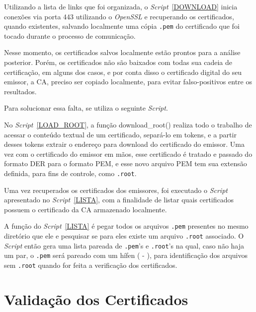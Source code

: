 		Utilizando a lista de links que foi organizada, o \textit{Script}~\ref{DOWNLOAD} inicia conexões via porta 443 utilizando o \textit{OpenSSL} e recuperando os certificados, quando existentes, salvando localmente uma cópia \texttt{.pem} do certificado que foi tocado durante o processo de comunicação.
		
		
		Nesse momento, os certificados salvos localmente estão prontos para a análise posterior. Porém, os certificados não são baixados com todas sua cadeia de certificação, em alguns dos casos, e por conta disso o certificado digital do seu emissor, a CA, preciso ser copiado localmente, para evitar falso-positivos entre os resultados.
		
		Para solucionar essa falta, se utiliza o seguinte \textit{Script}.
		
		
		No \textit{Script}~\ref{LOAD_ROOT}, a função download\_root() realiza todo o trabalho de acessar o conteúdo textual de um certificado, separá-lo em tokens, e  a partir desses tokens extrair o endereço para download do certificado do emissor. Uma vez com o certificado do emissor em mãos, esse certificado é tratado e passado do formato DER para o formato PEM, e esse novo arquivo PEM tem sua extensão definida, para fins de controle, como \texttt{.root}.
		
		Uma vez recuperados os certificados dos emissores, foi executado o \textit{Script} apresentado no \textit{Script}~\ref{LISTA}, com a finalidade de listar quais certificados possuem o certificado da CA armazenado localmente.

		
		A função do \textit{Script}~\ref{LISTA} é pegar todos os arquivos \texttt{.pem} presentes no mesmo diretório que ele e pesquisar se para eles existe um arquivo \texttt{.root} associado. O \textit{Script} então gera uma lista pareada de \texttt{.pem}'s e \texttt{.root}'s na qual, caso não haja um par, o \texttt{.pem} será pareado com um hífen ( - ), para identificação dos arquivos sem \texttt{.root} quando for feita a verificação dos certificados.

		\section[Validação dos Certificados]{Validação dos Certificados}

